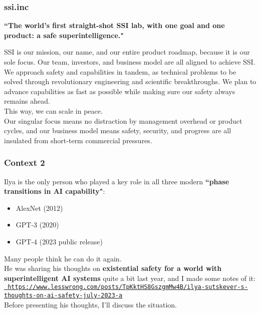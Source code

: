 \documentclass{beamer}
\newenvironment{customquote}
  {\begin{adjustwidth}{2em}{2em}\noindent\textnormal}
  {\end{adjustwidth}}
\newcommand{\msblue}[1]{{\color{myblue} #1}}
\begin{document}
\begin{frame}

  \frametitle{ssi.inc}

{\bf ``The world's first straight-shot SSI lab, with one goal and one product: a safe superintelligence."}\\[2ex]

\begin{customquote}
{\small SSI is our mission, our name, and our entire product roadmap, because it is our sole focus. Our team, investors, and business model are all aligned to achieve SSI.}\\[1ex]

{\small We approach safety and capabilities in tandem, as technical problems to be solved through revolutionary engineering and scientific breakthroughs. We plan to advance capabilities as fast as possible while making sure our safety always remains ahead.}\\[1ex]

{\small This way, we can scale in peace.}\\[1ex]

{\small Our singular focus means no distraction by management overhead or product cycles, and our business model means safety, security, and progress are all insulated from short-term commercial pressures.} 
\end{customquote}

\end{frame}


\begin{frame}

  \frametitle{Context 2}

Ilya is the only person who played a key role in all three modern {\bf ``phase transitions in AI capability"}:\\[2ex]

\begin{itemize}
  \item AlexNet (2012)
  \item GPT-3 (2020)
  \item GPT-4 (2023 public release)\\[2ex]
\end{itemize}

Many people think he can do it again.\\[2ex]

He was sharing his thoughts on {\bf existential safety for a world with superintelligent AI systems} quite a bit last year,
and I made some notes of it:\\[2ex]

\href{https://www.lesswrong.com/posts/TpKktHS8GszgmMw4B/ilya-sutskever-s-thoughts-on-ai-safety-july-2023-a}{\tt\tiny \msblue{https://www.lesswrong.com/posts/TpKktHS8GszgmMw4B/ilya-sutskever-s-thoughts-on-ai-safety-july-2023-a}}\\[2ex]

Before presenting his thoughts, I'll discuss the situation.

\end{frame}
\end{document}
